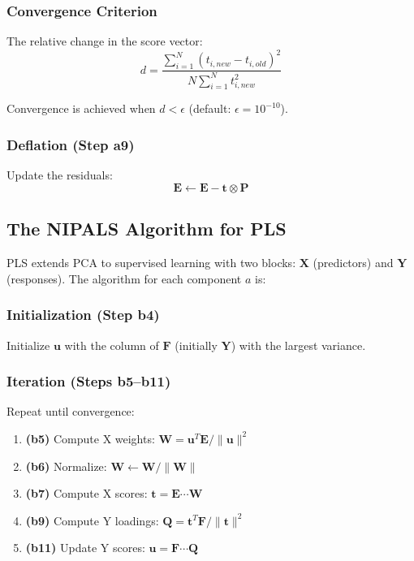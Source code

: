\documentclass[12pt,a4paper]{article}
\begin{document}
\subsubsection{Convergence Criterion}
The relative change in the score vector:
$$d = \frac{\sum_{i=1}^{N} (t_{i,new} - t_{i,old})^2}{N \sum_{i=1}^{N} t_{i,new}^2}$$

Convergence is achieved when $d < \epsilon$ (default: $\epsilon = 10^{-10}$).

\subsubsection{Deflation (Step a9)}
Update the residuals:
$$\mathbf{E} \leftarrow \mathbf{E} - \mathbf{t} \otimes \mathbf{P}$$

\subsection{The NIPALS Algorithm for PLS}

PLS extends PCA to supervised learning with two blocks: $\mathbf{X}$ (predictors) and $\mathbf{Y}$ (responses). The algorithm for each component $a$ is:

\subsubsection{Initialization (Step b4)}
Initialize $\mathbf{u}$ with the column of $\mathbf{F}$ (initially $\mathbf{Y}$) with the largest variance.

\subsubsection{Iteration (Steps b5--b11)}
Repeat until convergence:
\begin{enumerate}
    \item \textbf{(b5)} Compute X weights: $\mathbf{W} = \mathbf{u}^T \mathbf{E} / \|\mathbf{u}\|^2$
    \item \textbf{(b6)} Normalize: $\mathbf{W} \leftarrow \mathbf{W} / \|\mathbf{W}\|$
    \item \textbf{(b7)} Compute X scores: $\mathbf{t} = \mathbf{E} \cdots \mathbf{W}$
    \item \textbf{(b9)} Compute Y loadings: $\mathbf{Q} = \mathbf{t}^T \mathbf{F} / \|\mathbf{t}\|^2$
    \item \textbf{(b11)} Update Y scores: $\mathbf{u} = \mathbf{F} \cdots \mathbf{Q}$
\end{enumerate}
\end{document}
